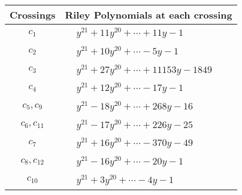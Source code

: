 \documentclass[1p]{elsarticle_modified}
\theoremstyle{definition}
\begin{document}
\begin{tabular}{m{50pt}|m{274pt}}
Crossings & \hspace{64pt}Riley Polynomials at each crossing \\
\hline $$\begin{aligned}c_{1}\end{aligned}$$&$\begin{aligned}
&y^{21}+11 y^{20}+\cdots+11 y-1
\end{aligned}$\\
\hline $$\begin{aligned}c_{2}\end{aligned}$$&$\begin{aligned}
&y^{21}+10 y^{20}+\cdots-5 y-1
\end{aligned}$\\
\hline $$\begin{aligned}c_{3}\end{aligned}$$&$\begin{aligned}
&y^{21}+27 y^{20}+\cdots+11153 y-1849
\end{aligned}$\\
\hline $$\begin{aligned}c_{4}\end{aligned}$$&$\begin{aligned}
&y^{21}+12 y^{20}+\cdots-17 y-1
\end{aligned}$\\
\hline $$\begin{aligned}c_{5},c_{9}\end{aligned}$$&$\begin{aligned}
&y^{21}-18 y^{20}+\cdots+268 y-16
\end{aligned}$\\
\hline $$\begin{aligned}c_{6},c_{11}\end{aligned}$$&$\begin{aligned}
&y^{21}-17 y^{20}+\cdots+226 y-25
\end{aligned}$\\
\hline $$\begin{aligned}c_{7}\end{aligned}$$&$\begin{aligned}
&y^{21}+16 y^{20}+\cdots-370 y-49
\end{aligned}$\\
\hline $$\begin{aligned}c_{8},c_{12}\end{aligned}$$&$\begin{aligned}
&y^{21}-16 y^{20}+\cdots-20 y-1
\end{aligned}$\\
\hline $$\begin{aligned}c_{10}\end{aligned}$$&$\begin{aligned}
&y^{21}+3 y^{20}+\cdots-4 y-1
\end{aligned}$\\
\hline
\end{tabular}\\~\\
\end{document}
